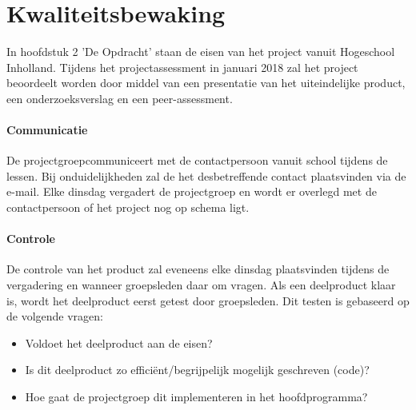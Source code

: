 \documentclass[11pt]{article}
\begin{document}
\section{Kwaliteitsbewaking}

\begin{flushleft}
	In hoofdstuk 2 'De Opdracht' staan de eisen van het project vanuit Hogeschool Inholland. Tijdens het projectassessment in januari 2018 zal het project beoordeelt worden door middel van een presentatie van het uiteindelijke product, een onderzoeksverslag en een peer-assessment.
\end{flushleft}
\paragraph{Communicatie}
\begin{flushleft}
	De projectgroepcommuniceert met de contactpersoon vanuit school tijdens de lessen. Bij onduidelijkheden zal de het desbetreffende contact plaatsvinden via de e-mail. Elke dinsdag vergadert de projectgroep en wordt er overlegd met de contactpersoon of het project nog op schema ligt. 
\end{flushleft}
\paragraph{Controle}
\begin{flushleft}
	De controle van het product zal eveneens elke dinsdag plaatsvinden tijdens de vergadering en wanneer groepsleden daar om vragen. Als een deelproduct klaar is, wordt het deelproduct eerst getest door groepsleden. Dit testen is gebaseerd op de volgende vragen:
	\begin{itemize}
		\item Voldoet het deelproduct aan de eisen?
		\item Is dit deelproduct zo efficiënt/begrijpelijk mogelijk geschreven (code)?
		\item Hoe gaat de projectgroep dit implementeren in het hoofdprogramma?
	\end{itemize}
\end{flushleft}
\end{document}
